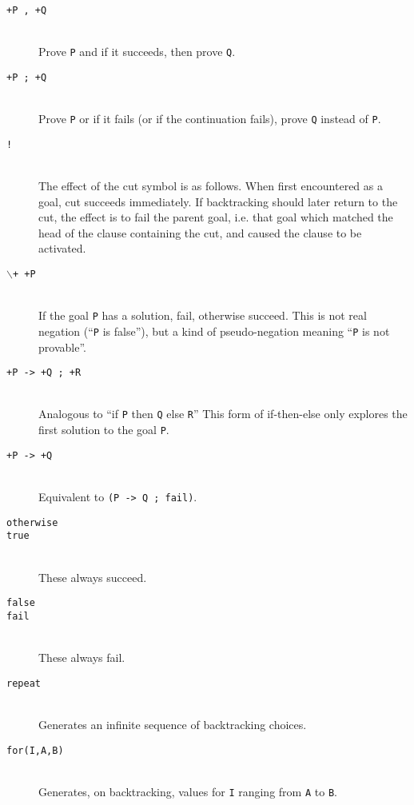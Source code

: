 \begin{description}

\item [{\tt +P , +Q}]~\\
	Prove {\tt P} and if it succeeds, then prove {\tt Q}.

\item [{\tt +P ; +Q}]~\\
	Prove {\tt P} or if it fails (or if the continuation fails),
	prove {\tt Q} instead  of {\tt P}.

\item [{\tt !}]~\\
	The effect of the cut symbol is as follows.  When first
	encountered as a goal, cut succeeds immediately.  If backtracking
	should later return to the cut, the effect is to fail the parent
	goal, i.e. that goal which matched the head of the clause containing
	the cut, and caused the clause to be activated. 

\item [{\tt $\backslash$+ +P}]~\\
	If the goal {\tt P} has a solution, fail, otherwise succeed.
	This is not real negation (``{\tt P} is false''), but a kind of
	pseudo-negation meaning ``{\tt P} is not provable''.  

\item [{\tt +P -> +Q ; +R}]~\\
	Analogous to ``if {\tt P} then {\tt Q} else {\tt R}''
	This form of if-then-else only explores the first solution to
	the goal {\tt P}. 

\item [{\tt +P -> +Q}]~\\
	Equivalent to {\tt (P -> Q ; fail)}.


\item [{\tt otherwise}]
\item [{\tt true}]~\\
	These always succeed.

\item [{\tt false}]
\item [{\tt fail}]~\\
	These always fail.

\item [{\tt repeat}]~\\
	Generates an infinite sequence of backtracking choices.

\item [{\tt for(I,A,B)}]~\\
	Generates, on backtracking, values for {\tt I} ranging from
	{\tt A} to {\tt B}.


\end{description}
